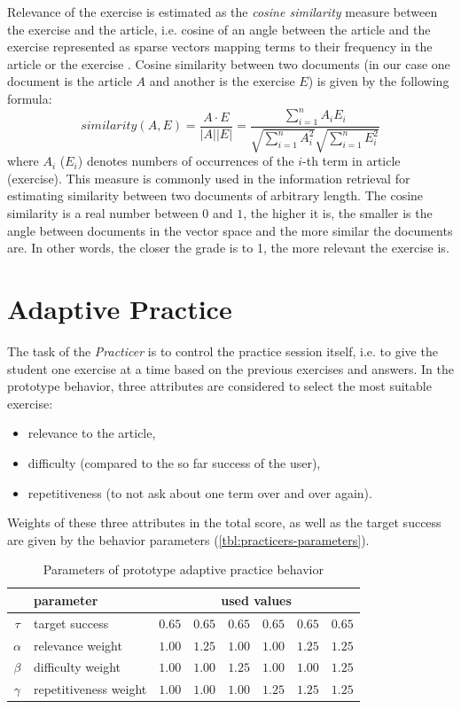 \documentclass[12pt, twoside]{fithesis2}
\renewcommand{\_}{\leavevmode \kern0.07em\vbox{\hrule width0.4em}}
\newcommand{\squarebullet}{\textcolor{black}{\raisebox{0.15em}{\rule{4pt}{4pt}}}}
\newcommand{\emptysquarebullet}{\textcolor{black}{\raisebox{0.10em}{\tiny$\square$}}}
\newenvironment{myItemize}{
  \begin{itemize}[leftmargin=2em,rightmargin=1em,itemsep=\parskip ,parsep=0em,topsep=0em,partopsep=0em]
  \renewcommand{\labelitemi}{\squarebullet}
  \renewcommand{\labelitemii}{\textbullet}
}{
  \end{itemize}
}
\begin{document}
Relevance of the exercise is estimated as the \textit{cosine similarity} measure between the exercise and the article,
i.e. cosine of an angle between the article and the exercise represented as sparse vectors mapping terms to their frequency in the article or the exercise
\cite[][121]{information-retrieval}.
Cosine similarity between two documents (in our case one document is the article $A$ and another is the exercise $E$) is given by the following formula:
$$
similarity(A, E)
= \frac{A \cdot E}{|A| |E|}
= \frac{\sum_{i=1}^{n} A_i E_i}{\sqrt{\sum_{i=1}^{n} A_i^2}\sqrt{\sum_{i=1}^{n} E_i^2}}
$$
where $A_i$ ($E_i$) denotes numbers of occurrences of the $i$-th term in article (exercise).
This measure is commonly used in the information retrieval for estimating similarity between two documents of arbitrary length. The cosine similarity is a real number between $0$ and $1$, the higher it is, the smaller is the angle between documents in the vector space and the more similar the documents are.
In other words, the closer the grade is to 1, the more relevant the exercise is.


\section{Adaptive Practice}
\label{sec:smartoo-practice}

The task of the \textit{Practicer} is to control the practice session itself, i.e. to give the student one exercise at a time based on the previous exercises and answers.
In the prototype behavior, three attributes are considered to select the most suitable exercise:
\begin{myItemize}
  \item relevance to the article,
  \item difficulty (compared to the so far success of the user),
  \item repetitiveness (to not ask about one term over and over again).
\end{myItemize}
Weights of these three attributes in the total score, as well as the target success
are given by the behavior parameters (\autoref{tbl:practicers-parameters}).
\begin{table}[h]
\begin{center}
\begin{tabular}{| c | l | r | r |  r  |  r |  r | r |}
  \hline
           & parameter & \multicolumn{6}{c|}{used values} \\
  \hline
  $\tau$   & target success        & $0.65$ & $0.65$ & $0.65$ & $0.65$ & $0.65$ & $0.65$\\
  $\alpha$ & relevance weight      & $1.00$ & $1.25$ & $1.00$ & $1.00$ & $1.25$ & $1.25$\\
  $\beta$  & difficulty weight     & $1.00$ & $1.00$ & $1.25$ & $1.00$ & $1.00$ & $1.25$\\
  $\gamma$ & repetitiveness weight & $1.00$ & $1.00$ & $1.00$ & $1.25$ & $1.25$ & $1.25$\\
  \hline
\end{tabular}
\end{center}
\caption{Parameters of prototype adaptive practice behavior}
\label{tbl:practicers-parameters}
\end{table}
\end{document}
